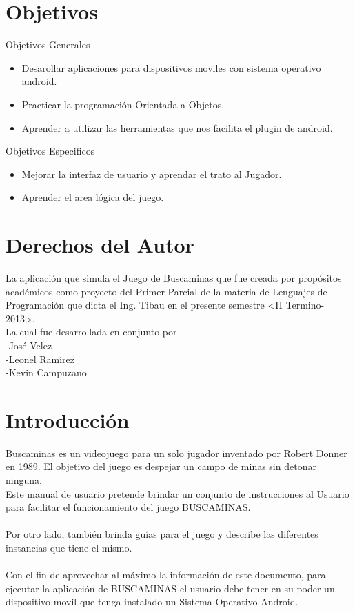 \documentclass[12pt,oneside]{book}
\begin{document}
\tableofcontents

\chapter{Objetivos}
Objetivos Generales
\begin{itemize}
\item Desarollar aplicaciones para dispositivos moviles con sistema operativo android.
\item Practicar la programación Orientada a Objetos.
\item Aprender a utilizar las herramientas que nos facilita el plugin de android.
\end{itemize}
Objetivos Especificos
\begin{itemize}
\item Mejorar la interfaz de usuario y aprendar el trato al Jugador.
\item Aprender el area lógica del juego.
\end{itemize}

\chapter{Derechos del Autor}
La aplicaci\'on que simula el Juego de Buscaminas que fue creada por prop\'ositos acad\'emicos como proyecto del Primer Parcial de la materia de Lenguajes de Programación que dicta el Ing. Tibau en el presente semestre <II Termino-2013>.
\\La cual fue desarrollada en conjunto por \\-José Velez \\ -Leonel Ramirez \\ -Kevin Campuzano


\chapter{Introducción}
Buscaminas es un videojuego para un solo jugador inventado por Robert Donner en 1989. El objetivo del juego es despejar un campo de minas sin detonar ninguna.\\
Este manual de usuario pretende brindar un conjunto de instrucciones al Usuario para facilitar el funcionamiento del juego BUSCAMINAS. \ \\ \\ 
Por otro lado, también brinda guías para el juego y describe las diferentes instancias que tiene el mismo. \ \\ \\
Con el fin de aprovechar al máximo la información de este documento, para ejecutar la aplicación de BUSCAMINAS el usuario debe tener en su poder un dispositivo movil que tenga instalado un Sistema Operativo Android.
\end{document}
